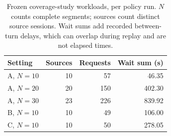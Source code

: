 \begin{table}[t]
  \centering
  \small
  \setlength{\tabcolsep}{4pt}
  \begin{tabular}{lrrr}
    \toprule
    Setting & Sources & Requests & Wait sum (s) \\
    \midrule
    A, $N=10$ & 10 & 57 & 46.35 \\
    A, $N=20$ & 20 & 150 & 402.30 \\
    A, $N=30$ & 23 & 226 & 839.92 \\
    B, $N=10$ & 10 & 49 & 106.00 \\
    C, $N=10$ & 10 & 50 & 278.05 \\
    \bottomrule
  \end{tabular}
  \caption{Frozen coverage-study workloads, per policy run. $N$ counts complete segments; sources count distinct source sessions. Wait sums add recorded between-turn delays, which can overlap during replay and are not elapsed times.}
  \label{tab:replication-coverage-workloads}
\end{table}
